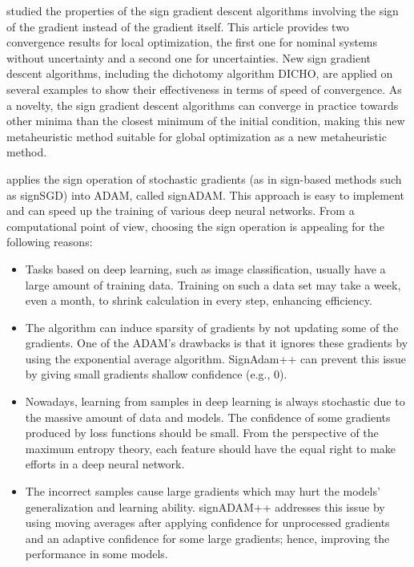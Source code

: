 \documentclass[11pt]{book}
\begin{document}
\cite{moulay2019properties} studied the properties of the sign gradient
descent algorithms involving the sign of the gradient instead of the
gradient itself. This article provides two convergence results for
local optimization, the first one for nominal systems without uncertainty
and a second one for uncertainties. New sign gradient descent algorithms,
including the dichotomy algorithm DICHO, are applied on several examples
to show their effectiveness in terms of speed of convergence. As a
novelty, the sign gradient descent algorithms can converge in practice
towards other minima than the closest minimum of the initial condition,
making this new metaheuristic method suitable for global optimization
as a new metaheuristic method.

\cite{wang2019signadam++} applies the sign operation of stochastic
gradients (as in sign-based methods such as signSGD) into ADAM, called
signADAM. This approach is easy to implement and can speed up the
training of various deep neural networks. From a computational point
of view, choosing the sign operation is appealing for the following
reasons:
\begin{itemize}
\item Tasks based on deep learning, such as image classification, usually
have a large amount of training data. \textquotedbl Training\textquotedbl{}
on such a data set may take a week, even a month, to shrink calculation
in every step, enhancing efficiency.
\item The algorithm can induce sparsity of gradients by not updating some
of the gradients. One of the ADAM's drawbacks is that it ignores these
gradients by using the exponential average algorithm. SignAdam++ can
prevent this issue by giving small gradients shallow confidence (e.g.,
$0$).
\item Nowadays, learning from samples in deep learning is always stochastic
due to the massive amount of data and models. The confidence of some
gradients produced by loss functions should be small. From the perspective
of the maximum entropy theory, each feature should have the equal
right to make efforts in a deep neural network.
\item The incorrect samples cause large gradients which may hurt the models'
generalization and learning ability. signADAM++ addresses this issue
by using moving averages after applying confidence for unprocessed
gradients and an adaptive confidence for some large gradients; hence,
improving the performance in some models.
\end{itemize}
\end{document}
